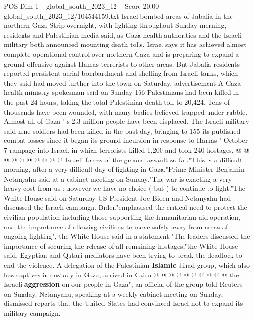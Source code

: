\begin{textsample}{POS Dim 1 – global\_south\_2023\_12 – Score 20.00 – global\_south\_2023\_12/104544159.txt}  \label{ex:f1_pos_165}
Israel bombed areas of Jabalia in the northern Gaza Strip overnight, with fighting throughout Sunday morning, residents and Palestinian media said, as Gaza health authorities and the Israeli military both announced mounting death tolls.
Israel says it has achieved almost complete operational control over northern Gaza and is preparing to expand a ground offensive against Hamas terrorists to other areas.
But Jabalia residents reported persistent aerial bombardment and shelling from Israeli tanks, which they said had moved further into the town on Saturday. advertisement A Gaza health ministry spokesman said on Sunday 166 Palestinians had been killed in the past 24 hours, taking the total Palestinian death toll to 20,424.
Tens of thousands have been wounded, with many bodies believed trapped under rubble.
Almost all of Gaza ' s 2.3 million people have been displaced.
The Israeli military said nine soldiers had been killed in the past day, bringing to 155 its published combat losses since it began its ground incursion in response to Hamas ' October 7 rampage into Israel, in which terrorists killed 1,200 and took 240 hostages. @ @ @ @ @ @ @ @ @ @ Israeli forces of the ground assault so far."This is a difficult morning, after a very difficult day of fighting in Gaza,"Prime Minister Benjamin Netanyahu said at a cabinet meeting on Sunday."The war is exacting a very heavy cost from us ; however we have no choice ( but ) to continue to fight."The White House said on Saturday US President Joe Biden and Netanyahu had discussed the Israeli campaign.
Biden"emphasised the critical need to protect the civilian population including those supporting the humanitarian aid operation, and the importance of allowing civilians to move safely away from areas of ongoing fighting", the White House said in a statement."The leaders discussed the importance of securing the release of all remaining hostages,"the White House said.
Egyptian and Qatari mediators have been trying to break the deadlock to end the violence.
A delegation of the Palestinian \textbf{Islamic} Jihad group, which also has captives in custody in Gaza, arrived in Cairo @ @ @ @ @ @ @ @ @ @ the Israeli \textbf{aggression} on our people in Gaza", an official of the group told Reuters on Sunday.
Netanyahu, speaking at a weekly cabinet meeting on Sunday, dismissed reports that the United States had convinced Israel not to expand its military campaign.

\end{textsample}
